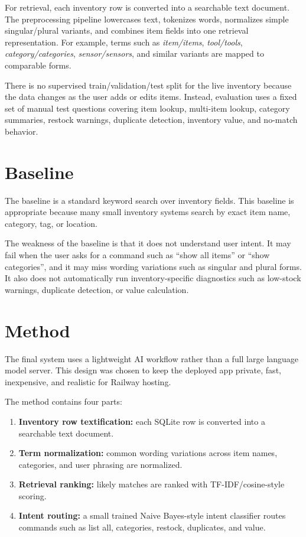 \documentclass[11pt]{article}
\begin{document}
For retrieval, each inventory row is converted into a searchable text document. The preprocessing pipeline lowercases text, tokenizes words, normalizes simple singular/plural variants, and combines item fields into one retrieval representation. For example, terms such as \textit{item/items}, \textit{tool/tools}, \textit{category/categories}, \textit{sensor/sensors}, and similar variants are mapped to comparable forms.

There is no supervised train/validation/test split for the live inventory because the data changes as the user adds or edits items. Instead, evaluation uses a fixed set of manual test questions covering item lookup, multi-item lookup, category summaries, restock warnings, duplicate detection, inventory value, and no-match behavior.

\section{Baseline}

The baseline is a standard keyword search over inventory fields. This baseline is appropriate because many small inventory systems search by exact item name, category, tag, or location.

The weakness of the baseline is that it does not understand user intent. It may fail when the user asks for a command such as ``show all items'' or ``show categories'', and it may miss wording variations such as singular and plural forms. It also does not automatically run inventory-specific diagnostics such as low-stock warnings, duplicate detection, or value calculation.

\section{Method}

The final system uses a lightweight AI workflow rather than a full large language model server. This design was chosen to keep the deployed app private, fast, inexpensive, and realistic for Railway hosting.

The method contains four parts:

\begin{enumerate}
\item \textbf{Inventory row textification:} each SQLite row is converted into a searchable text document.
\item \textbf{Term normalization:} common wording variations across item names, categories, and user phrasing are normalized.
\item \textbf{Retrieval ranking:} likely matches are ranked with TF-IDF/cosine-style scoring.
\item \textbf{Intent routing:} a small trained Naive Bayes-style intent classifier routes commands such as list all, categories, restock, duplicates, and value.
\end{enumerate}
\end{document}
